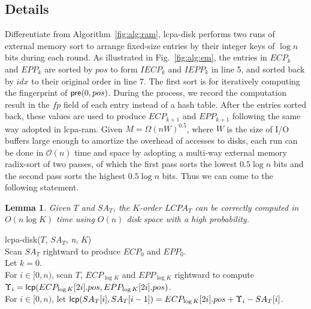 \documentclass[10pt,journal,compsoc]{IEEEtran}
\newtheorem{Lemma}{Lemma}
\begin{document}
\begin{CJK*}{GBK}{song}
\subsection{Details}
Differentiate from Algorithm~\ref{fig:alg:ram}, lcpa-disk performs two runs of external memory sort to arrange fixed-size entries by their integer keys of $\log n$ bits during each round. As illustrated in Fig.~\ref{fig:alg:em}, the entries in $ECP_k$ and $EPP_k$ are sorted by $pos$ to form $IECP_k$ and $IEPP_k$ in line 5, and sorted back by $idx$ to their original order in line 7. The first sort is for iteratively computing the fingerprint of ${\sf pre}(0,pos)$. During the process, we record the computation result in the $fp$ field of each entry instead of a hash table. After the entries sorted back, these values are used to produce $ECP_{k+1}$ and $EPP_{k+1}$ following the same way adopted in lcpa-ram. Given $M=\Omega(nW)^{0.5}$, where $W$ is the size of {I/O} buffers large enough to amortize the overhead of accesses to disks, each run can be done in $\mathcal{O}(n)$ time and space by adopting a multi-way external memory radix-sort of two passes, of which the first pass sorts the lowest $0.5\log n$ bits and the second pass sorts the highest $0.5\log n$ bits. Thus we can come to the following statement.

\begin{Lemma}
\label{thm:lcp:em}
Given $T$ and $SA_T$, the $K$-order $LCPA_T$ can be correctly computed in $O(n \log K)$ time using $O(n)$ disk space with a high probability.
\end{Lemma}

\begin{algorithm}[hbtp!]
\caption{Compute $K$-Order $LCPA_T$ in Disk}
\label{fig:alg:em}
lcpa-disk($T$, $SA_T$, {\em n}, $K$){\\
\SetAlgoNoLine
Scan $SA_T$ rightward to produce $ECP_0$ and $EPP_0$.\\
Let $k = 0$. \\
\While{$k < \log K$}{
\Indentp{-1em}
Radix-sort $ECP_k$ and $EPP_k$ by $pos$ to produce $IECP_k$ and $IEPP_k$. \\
For $i\in [0,n)$ and $j\in [0,2n)$, scan $T$ rightward to iteratively compute the fingerprint of ${\sf pre}(T,i)$ and assign $FP[0,i]$ to $IECP_k[j].fp$ or $IEPP_k[j].fp$ if $IECP_k[j].pos = i$ or $IEPP_k[j].pos = i$. \\
Radix-sort $IECP_k$ and $IEPP_k$ by $idx$ to reproduce $ECP_k$ and $EPP_k$. \\
For $i \in [0,n)$, scan $ECP_k$ and $EPP_k$ rightward to compute and compare each pair of $(FP[ECP_k[2i].pos+1,ECP_k[2i+1].pos], FP[EPP_k[2i].pos+1,EPP_k[2i+1].pos])$ for generating $ECP_{k+1}$ and $EPP_{k+1}$. \\
Let $k = k + 1$. \\
}
For $i \in [0,n)$, scan $T$, $ECP_{\log K}$ and $EPP_{\log K}$ rightward to compute $\Upsilon_i = {\sf lcp}(ECP_{\log K}[2i].pos,EPP_{\log K}[2i].pos)$. \\
For $i \in [0,n)$, let ${\sf lcp}(SA_T[i],SA_T[i-1])=ECP_{\log K}[2i].pos+\Upsilon_i-SA_T[i]$.\\
}
\end{algorithm}


\end{CJK*}
\end{document}
